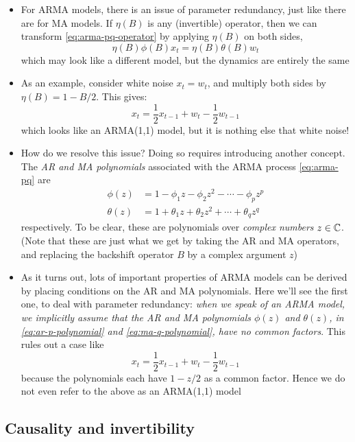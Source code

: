 \documentclass{article}
\begin{document}
\begin{itemize}
\item For ARMA models, there is an issue of parameter redundancy, just like
  there are for MA models. If $\eta(B)$ is any (invertible) operator, then we
  can transform \eqref{eq:arma-pq-operator} by applying $\eta(B)$ on both sides,  
  \[
  \eta(B) \phi(B) x_t = \eta(B) \theta(B) w_t  
  \]
  which may look like a different model, but the dynamics are entirely the
  same  

\item As an example, consider white noise $x_t = w_t$, and multiply both sides
  by $\eta(B) = 1 - B/2$. This gives:
  \[
  x_t = \frac{1}{2} x_{t-1} + w_t - \frac{1}{2} w_{t-1}
  \]
  which looks like an ARMA(1,1) model, but it is nothing else that white noise!
 
\item How do we resolve this issue? Doing so requires introducing another
  concept. The \emph{AR and MA polynomials} associated with the ARMA process
  \eqref{eq:arma-pq} are 
  \begin{align}
  \label{eq:ar-p-polynomial}
  \phi(z) &= 1 - \phi_1 z - \phi_2 z^2 - \cdots - \phi_p z^p \\
  \label{eq:ma-q-polynomial}
  \theta(z) &= 1 + \theta_1 z + \theta_2 z^2 + \cdots + \theta_q z^q
  \end{align}
  respectively. To be clear, these are polynomials over \emph{complex numbers}
  $z \in \mathbb{C}$. (Note that these are just what we get by taking the AR and MA
  operators, and replacing the backshift operator $B$ by a complex argument $z$) 

\item As it turns out, lots of important properties of ARMA models can be
  derived by placing conditions on the AR and MA polynomials. Here we'll see the
  first one, to deal with parameter redundancy: \emph{when we speak of an ARMA
    model, we implicitly assume that the AR and MA polynomials $\phi(z)$ and
    $\theta(z)$, in \eqref{eq:ar-p-polynomial} and \eqref{eq:ma-q-polynomial},
    have no common factors}. This rules out a case like   
  \[
  x_t = \frac{1}{2} x_{t-1} + w_t - \frac{1}{2} w_{t-1}
  \]
  because the polynomials each have $1-z/2$ as a common factor. Hence we do not  
  even refer to the above as an ARMA(1,1) model
\end{itemize}

\subsection{Causality and invertibility}
\end{document}
